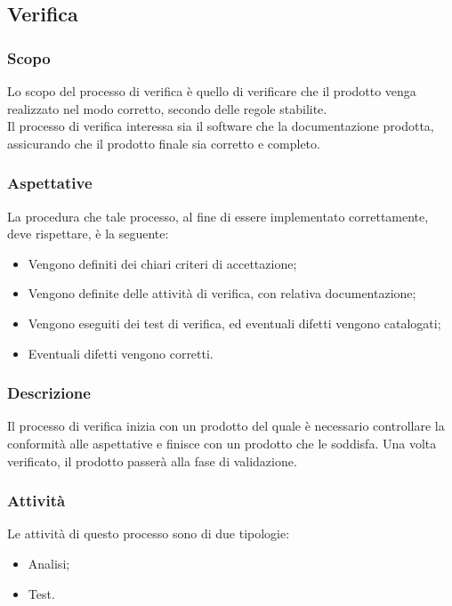 \documentclass[../norme-di-progetto.tex]{subfiles}
\begin{document}
\subsection{Verifica}

\subsubsection{Scopo}
Lo scopo del processo di verifica è quello di verificare che il prodotto venga realizzato nel modo corretto, secondo delle regole stabilite. \\
Il processo di verifica interessa sia il software che la documentazione prodotta, assicurando che il prodotto finale sia corretto e completo.

\subsubsection{Aspettative}
La procedura che tale processo, al fine di essere implementato correttamente, deve rispettare, è la seguente:
\begin{itemize}
  \item Vengono definiti dei chiari criteri di accettazione;
  \item Vengono definite delle attività di verifica, con relativa documentazione;
  \item Vengono eseguiti dei test di verifica, ed eventuali difetti vengono catalogati;
  \item Eventuali difetti vengono corretti.
\end{itemize}

\subsubsection{Descrizione}
Il processo di verifica inizia con un prodotto del quale è necessario controllare la conformità alle aspettative e finisce con un prodotto che le soddisfa. Una volta verificato, il prodotto passerà alla fase di validazione.

\subsubsection{Attività}
Le attività di questo processo sono di due tipologie:
\begin{itemize}
  \item Analisi;
  \item Test.
\end{itemize}
\end{document}
